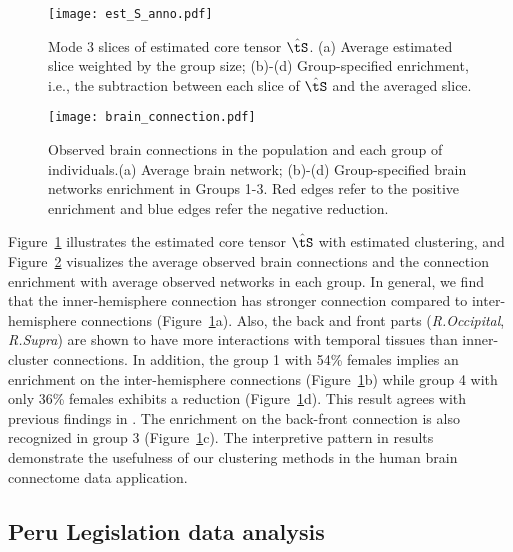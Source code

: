 \documentclass[lettersize,onecolumn,journal]{IEEEtran}
\theoremstyle{definition}
\theoremstyle{definition}
\begin{document}
\begin{figure*}[htb]
    \centering
    \texttt{[image: est\_S\_anno.pdf]}
    \caption{Mode 3 slices of estimated core tensor $\hat \tS$. (a) Average estimated slice weighted by the group size; (b)-(d) Group-specified enrichment, i.e., the subtraction between each slice of $\hat \tS$ and the averaged slice. }
    \label{fig:ests}
\end{figure*}

\begin{figure*}[htb]
    \centering
    \texttt{[image: brain\_connection.pdf]}
    \caption{Observed brain connections in the population and each group of individuals.(a) Average brain network; (b)-(d) Group-specified brain networks enrichment in Groups 1-3. Red edges refer to the positive enrichment and blue edges refer the negative reduction.}
    \label{fig:brain_conn}
\end{figure*}

Figure~\ref{fig:ests} illustrates the estimated core tensor $\hat \tS$ with estimated clustering, and Figure~\ref{fig:brain_conn} visualizes the average observed brain connections and the connection enrichment with average observed networks in each group. In general, we find that the inner-hemisphere connection has stronger connection compared to inter-hemisphere connections (Figure~\ref{fig:ests}a). Also, the back and front parts (\emph{R.Occipital}, \emph{R.Supra}) are shown to have more interactions with temporal tissues than inner-cluster connections. In addition, the group 1 with 54\% females implies an enrichment on the inter-hemisphere connections (Figure~\ref{fig:ests}b) while group 4 with only 36\% females exhibits a reduction (Figure~\ref{fig:ests}d). This result agrees with previous findings in \cite{hu2021generalized}. The enrichment on the back-front connection is also recognized in group 3 (Figure~\ref{fig:ests}c). The interpretive pattern in results demonstrate the usefulness of our clustering methods in the human brain connectome data application. 


\subsection{Peru Legislation data analysis}
\end{document}
